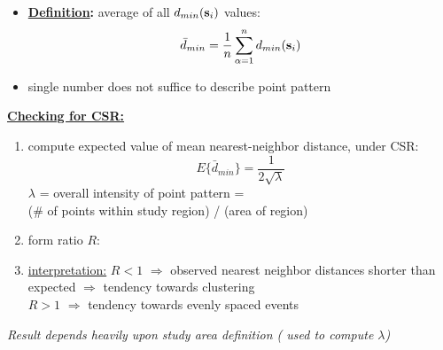 \documentclass[portrait]{seminar}
\begin{document}
%
%
\begin{slide*}
\begin{center}
 \vspace*{-0.5cm} 
\end{center}

\vspace{0.3cm}
\begin{itemize}
\item \textbf{\underline{Definition}:} average of all
$d_{min}({\bf s}_i)$ values:
\[
\bar{d}_{min} = \frac{1}{n} \sum_{\alpha=1}^n d_{min}({\bf s}_i)
\]
\item single number does not suffice to describe point pattern
\end{itemize}


\vspace{0.3cm} \underline{\textbf{Checking for CSR:}}
\begin{enumerate}
\item compute expected value of mean nearest-neighbor
distance, under CSR:
\[
E\{ \bar{d}_{min} \} = \frac{1} { 2 \sqrt{\lambda} }
\]
{\small $\lambda$ = overall intensity of point pattern = \\
(\# of points within study region) / (area of region)}
\item form ratio $R$: $\; \;$
 \vspace{0.3cm}
\item \underline{interpretation:}
$R < 1$ $\Rightarrow$ observed nearest neighbor distances shorter
than expected $\Rightarrow$ tendency
towards clustering \\
$R > 1$ $\Rightarrow$ tendency towards evenly spaced events
\end{enumerate}

\vspace{0.3cm}
\begin{center}
\emph{Result depends heavily upon study area definition ({\small
used to compute $\lambda$})}
\end{center}

\end{slide*}
\end{document}
